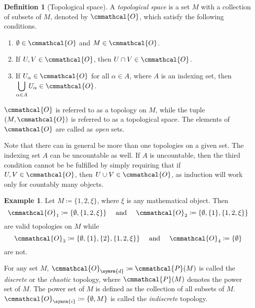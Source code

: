\documentclass[a4 paper, 12pt]{book}
\renewcommand{\mathcal}{\cmmathcal}
\renewcommand{\mathcal}{\cmmathcal}
\let\symcal\mathcal
\theoremstyle{definition}
\newtheorem{defn}{Definition}
\newtheorem{exmp}{Example}
\newcommand{\topology}{\symcal{O}}
\newcommand{\powerset}{\symcal{P}}
\begin{document}
    \begin{defn}[Topological space]
        A \textit{topological space} is a set \(M\) with a collection of subsets of \(M\), denoted by \(\topology\), which satisfy the following conditions.
        \begin{enumerate}
            \item \(\emptyset \in \topology\) and \(M \in \topology\).
            \item If \(U, V \in \topology\), then \(U \cap V \in \topology\).
            \item If \(U_\alpha \in \topology\) for all \(\alpha \in A\), where \(A\) is an indexing set, then \(\displaystyle \bigcup_{\alpha \in A} U_\alpha \in \topology\). \label{topthirdcondition}
        \end{enumerate}
        \(\topology\) is referred to as a topology on \(M\), while the tuple \((M, \topology)\) is referred to as a topological space. The elements of \(\topology\) are called as \textit{open} sets.
    \end{defn}
    Note that there can in general be more than one topologies on a given set. The indexing set \(A\) can be uncountable as well. If \(A\) is uncountable, then the third condition cannot be be fulfilled by simply requiring that if \(U,V \in \topology\), then \(U \cup V \in \topology\), as induction will work only for countably many objects.
    \begin{exmp}
        Let \(M \coloneq \{1, 2, \xi\}\), where \(\xi\) is any mathematical object. Then \[\topology_1 \coloneq \{\emptyset, \{1, 2, \xi\}\} \quad \text{ and } \quad \topology_2 \coloneq \{\emptyset, \{1\}, \{1, 2, \xi\}\}\] are valid topologies on \(M\) while \[\topology_3 \coloneq \{\emptyset, \{1\}, \{2\}, \{1, 2, \xi\}\} \quad \text{ and } \quad \topology_4 \coloneq \{\emptyset\}\] are not.
    \end{exmp}
    For any set \(M\), \(\topology_{\symrm{d}} \coloneq \powerset(M)\) is called the \textit{discrete} or the \textit{chaotic} topology, where \(\powerset(M)\) denotes the power set of \(M\). The power set of \(M\) is defined as the collection of all subsets of \(M\). \(\topology_{\symrm{i}} \coloneq \{\emptyset, M\}\) is called the \textit{indiscrete} topology.
\end{document}
